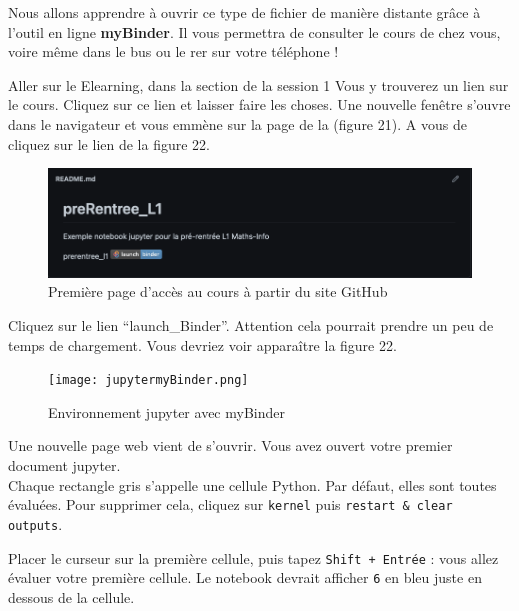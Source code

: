 \documentclass{article}
\begin{document}
\begin{exercice}

Nous allons apprendre à ouvrir ce type de fichier de manière distante grâce
à l'outil en ligne \textbf{myBinder}. Il vous permettra de consulter le cours de chez vous, voire
même dans le bus ou le rer sur votre téléphone !

Aller sur le Elearning, dans la section de la session 1 
Vous y trouverez un lien sur le cours. Cliquez sur ce lien et laisser faire les choses.
Une nouvelle fenêtre s'ouvre dans le navigateur et vous emmène sur la page de la (figure 21). A vous de cliquez sur le lien de la figure 22. 

\begin{figure}[h!]
    \begin{center}
    \includegraphics[scale=0.35]{Github_MyBinder.png}
    \caption{Première page d'accès au cours à partir du site GitHub}
     \end{center}
\end{figure} 

Cliquez sur le lien ``launch\_Binder''. Attention cela pourrait prendre un peu de temps de chargement.
Vous devriez voir apparaître la figure 22.

\begin{figure}[h!]
    \begin{center}
    \texttt{[image: jupytermyBinder.png]}
    \caption{Environnement jupyter avec myBinder}
     \end{center}
\end{figure}    

Une nouvelle page web vient de s'ouvrir. Vous avez ouvert votre premier document jupyter. \\
Chaque rectangle gris s'appelle une cellule Python. Par défaut,   elles sont
    toutes évaluées. Pour supprimer cela,   cliquez sur \texttt{kernel} puis 
    \texttt{restart \& clear outputs}.
    
Placer le curseur sur la première cellule,   puis tapez \texttt{Shift + Entrée} : vous allez
    évaluer votre première cellule. Le notebook devrait afficher \texttt{6} en bleu juste en dessous
    de la cellule.
    

\end{exercice}
\end{document}
